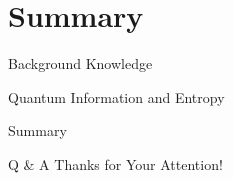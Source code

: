 \documentclass[xcolor=svgnames,handout]{beamer}
\begin{document}
\section{Summary}
\begin{frame}{}
\begin{itemize}
  {\color{gray}\item Background Knowledge\pause
  \item Quantum Information and Entropy\pause}
  \item Summary\pause
\end{itemize}
\end{frame}
\begin{frame}{Q \& A}
  Thanks for Your Attention!
\end{frame}
\end{document}
